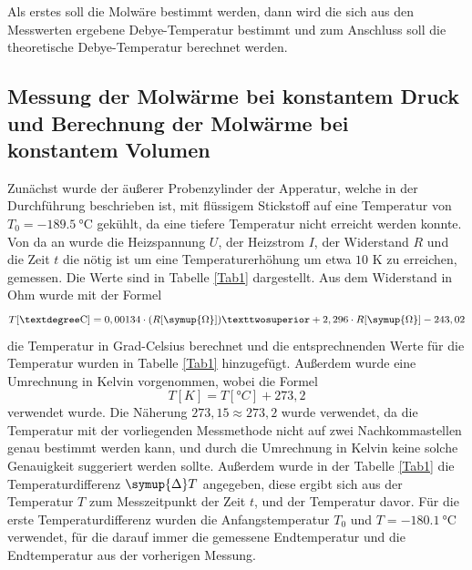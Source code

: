 
Als erstes soll die Molwäre bestimmt werden, dann wird die sich aus den Messwerten ergebene Debye-Temperatur 
bestimmt und zum Anschluss soll die theoretische Debye-Temperatur berechnet werden.

\subsection{Messung der Molwärme bei konstantem Druck und Berechnung der Molwärme bei konstantem Volumen}

Zunächst wurde der äußerer Probenzylinder der Apperatur, welche in der Durchführung beschrieben ist, mit 
flüssigem Stickstoff auf eine Temperatur von $T_0 = \SI{-189,5}{\celsius}$ gekühlt, da eine tiefere Temperatur 
nicht erreicht werden konnte. Von da an wurde die Heizspannung $U$, der Heizstrom $I$, der Widerstand $R$ 
und die Zeit $t$ die nötig ist um eine Temperaturerhöhung um etwa $10$ K zu erreichen, gemessen. Die Werte sind in Tabelle \ref{Tab1} 
dargestellt. Aus dem Widerstand in Ohm wurde mit der Formel 
\begin{equation*}
    T[\si{°C}] = 0,00134 \cdot (R[\symup{\Omega}])² + 2,296 \cdot R[\symup{\Omega}] -243,02
\end{equation*}
die Temperatur in Grad-Celsius berechnet und die entsprechnenden Werte für die Temperatur wurden 
in Tabelle \ref{Tab1} hinzugefügt. Außerdem wurde eine Umrechnung in Kelvin vorgenommen, 
wobei die Formel 
\begin{equation*}
    T[\si{K}] = T[\si{°C}] + 273,2
\end{equation*}
verwendet wurde. Die Näherung $273,15 \approx 273,2$ wurde verwendet, da die Temperatur mit der vorliegenden 
Messmethode nicht auf zwei Nachkommastellen genau bestimmt werden kann, und durch die Umrechnung in Kelvin 
keine solche Genauigkeit suggeriert werden sollte. 
Außerdem wurde in der Tabelle \ref{Tab1} die Temperaturdifferenz $\symup{\Delta}T$ angegeben, diese ergibt 
sich aus der Temperatur $T$ zum Messzeitpunkt der Zeit $t$, und der Temperatur davor. Für die erste 
Temperaturdifferenz wurden die Anfangstemperatur $T_0$ und $T=\SI{-180,1}{\celsius}$ verwendet, für die darauf 
immer die gemessene Endtemperatur und die Endtemperatur aus der vorherigen Messung.

